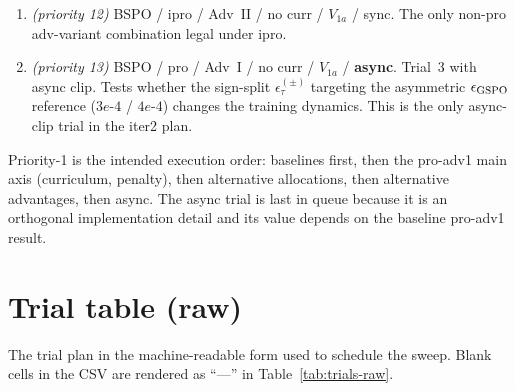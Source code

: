 \documentclass[11pt]{article}
\begin{document}
\begin{enumerate}[label=\textbf{Trial \arabic*}., wide=0pt]
\item \emph{(priority 12)} BSPO / \textsf{ipro} / Adv~II / no curr /
  $V_{1a}$ / sync. The only non-pro adv-variant combination legal
  under ipro.

\item \emph{(priority 13)} BSPO / \textsf{pro} / Adv~I / no curr /
  $V_{1a}$ / \textbf{async}. Trial~3 with async clip. Tests whether
  the sign-split $\epsilon_\tau^{(\pm)}$ targeting the asymmetric
  $\epsilon_{\rm GSPO}$ reference ($3e\text{-}4$ / $4e\text{-}4$)
  changes the training dynamics. This is the only async-clip trial
  in the iter2 plan.

\end{enumerate}

Priority-1 is the intended execution order: baselines first, then the
pro-adv1 main axis (curriculum, penalty), then alternative
allocations, then alternative advantages, then async. The async trial
is last in queue because it is an orthogonal implementation detail
and its value depends on the baseline pro-adv1 result.

\appendix
\section{Trial table (raw)}

The trial plan in the machine-readable form used to schedule the sweep.
Blank cells in the CSV are rendered as ``---'' in
Table~\ref{tab:trials-raw}.
\end{document}
